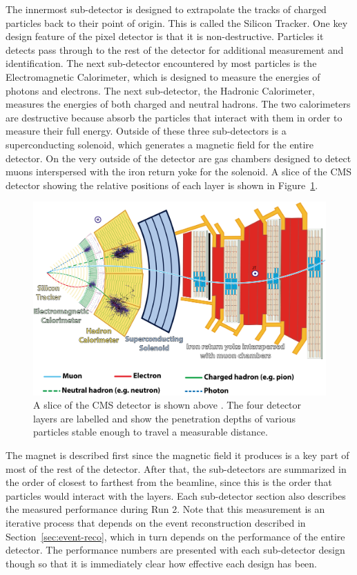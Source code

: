 The innermost sub-detector is designed to extrapolate the tracks of charged particles
back to their point of origin.
This is called the Silicon Tracker.
One key design feature of the pixel detector is that it is non-destructive.
Particles it detects pass through to the rest of the detector for additional
measurement and identification.
The next sub-detector encountered by most particles is the Electromagnetic Calorimeter,
which is designed to measure the energies of photons and electrons.
The next sub-detector, the Hadronic Calorimeter,
measures the energies of both charged and neutral hadrons.
The two calorimeters are destructive because  absorb the particles that interact with them
in order to measure their full energy.
Outside of these three sub-detectors is a superconducting solenoid,
which generates a magnetic field for the entire detector.
On the very outside of the detector are gas chambers designed to detect muons
interspersed with the iron return yoke for the solenoid.
A slice of the CMS detector showing the relative positions of each layer
is shown in Figure~\ref{fig:slice}.
\begin{figure}
  \centering
  \includegraphics[width=0.9\linewidth]{figures/CMSslice_whiteBackground.png}
  \caption[CMS detector slice]{
    A slice of the CMS detector is shown above \cite{Barney:2120661}.
    The four detector layers are labelled and show the penetration
    depths of various particles stable enough to travel a measurable distance.
    }
  \label{fig:slice}
\end{figure}

The magnet is described first since the magnetic field it produces is a key
part of most of the rest of the detector.
After that, the sub-detectors are summarized in the order of closest to farthest
from the beamline, since this is the order that particles would interact with the layers.
Each sub-detector section also describes the measured performance during Run 2.
Note that this measurement is an iterative process that depends on the event reconstruction
described in Section~\ref{sec:event-reco},
which in turn depends on the performance of the entire detector.
The performance numbers are presented with each sub-detector design though so that
it is immediately clear how effective each design has been.

